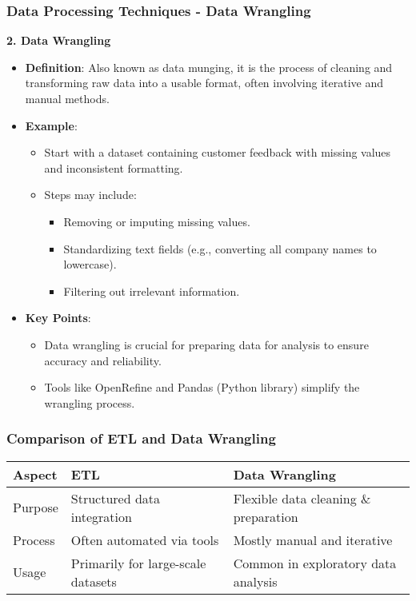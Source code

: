 \documentclass[aspectratio=169]{beamer}
\begin{document}
\begin{frame}[fragile]
    \frametitle{Data Processing Techniques - Data Wrangling}

    \textbf{2. Data Wrangling}
    
    \begin{itemize}
        \item \textbf{Definition}: Also known as data munging, it is the process of cleaning and transforming raw data into a usable format, often involving iterative and manual methods.
        
        \item \textbf{Example}:
        \begin{itemize}
            \item Start with a dataset containing customer feedback with missing values and inconsistent formatting.
            \item Steps may include:
            \begin{itemize}
                \item Removing or imputing missing values.
                \item Standardizing text fields (e.g., converting all company names to lowercase).
                \item Filtering out irrelevant information.
            \end{itemize}
        \end{itemize}

        \item \textbf{Key Points}:
        \begin{itemize}
            \item Data wrangling is crucial for preparing data for analysis to ensure accuracy and reliability.
            \item Tools like OpenRefine and Pandas (Python library) simplify the wrangling process.
        \end{itemize}
    \end{itemize}
\end{frame}

\begin{frame}[fragile]
    \frametitle{Comparison of ETL and Data Wrangling}

    \begin{table}[ht]
        \centering
        \begin{tabular}{|l|l|l|}
            \hline
            \textbf{Aspect} & \textbf{ETL} & \textbf{Data Wrangling} \\
            \hline
            Purpose & Structured data integration & Flexible data cleaning \& preparation \\
            \hline
            Process & Often automated via tools & Mostly manual and iterative \\
            \hline
            Usage & Primarily for large-scale datasets & Common in exploratory data analysis \\
            \hline
        \end{tabular}
    \end{table}
\end{frame}
\end{document}
